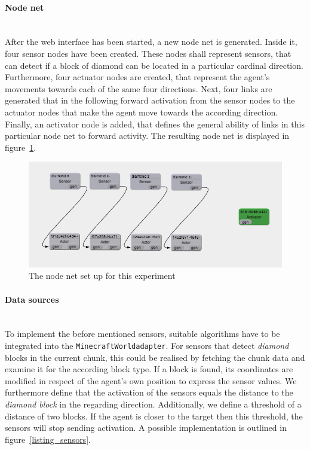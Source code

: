 \paragraph{Node net}$\;$ \\

After the web interface has been started, a new node net is generated. Inside it, four sensor nodes have been created. These nodes shall represent sensors, that can detect if a block of diamond can be located in a particular cardinal direction. Furthermore, four actuator nodes are created, that represent the agent's movements towards each of the same four directions. Next, four links are generated that in the following forward activation from the sensor nodes to the actuator nodes that make the agent move towards the according direction. Finally, an activator node is added, that defines the general ability of links in this particular node net to forward activity. The resulting node net is displayed in figure~\ref{nodenet_setup}.

\begin{figure}[h]
  \centering
    \includegraphics[width=14cm]{graphics/nodenet_setup}
  \caption{The node net set up for this experiment}
  \label{nodenet_setup}
\end{figure}

\paragraph{Data sources}$\;$ \\

To implement the before mentioned sensors, suitable algorithms have to be integrated into the \texttt{MinecraftWorldadapter}. For sensors that detect \emph{diamond} blocks in the current chunk, this could be realised by fetching the chunk data and examine it for the according block type. If a block is found, its coordinates are modified in respect of the agent's own position to express the sensor values. We furthermore define that the activation of the sensors equals the distance to the \emph{diamond block} in the regarding direction. Additionally, we define a threshold of a distance of two blocks. If the agent is closer to the target then this threshold, the sensors will stop sending activation. A possible implementation is outlined in figure~\ref{listing_sensors}. 

